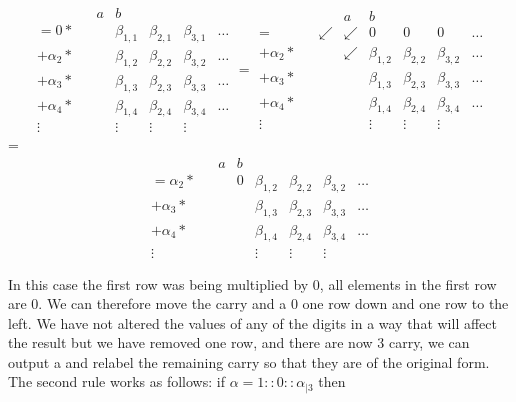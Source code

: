 \documentclass{cs4rep}
\begin{document}
\[ \begin{array}{lcc|ccccc}
& & a & b \\
= 0 * & & & \beta_{1,1} & \beta_{2,1} & \beta_{3,1} & \ldots \\
+ \alpha_{2} * & & & \beta_{1,2} & \beta_{2,2} & \beta_{3,2} & \ldots \\
+ \alpha_{3} * & & & \beta_{1,3} & \beta_{2,3} & \beta_{3,3} & \ldots \\
+ \alpha_{4} * & & & \beta_{1,4} & \beta_{2,4} & \beta_{3,4} & \ldots \\
\vdots & & & \vdots & \vdots & \vdots
\end{array}
=
\begin{array}{lccc|cccc}
& & & a & b \\
= & & \swarrow & \swarrow & 0 & 0 & 0 & \ldots \\
+ \alpha_{2} * & & & \swarrow & \beta_{1,2} & \beta_{2,2} & \beta_{3,2} & \ldots \\
+ \alpha_{3} * & & & & \beta_{1,3} & \beta_{2,3} & \beta_{3,3} & \ldots \\
+ \alpha_{4} * & & & & \beta_{1,4} & \beta_{2,4} & \beta_{3,4} & \ldots \\
\vdots & & & & \vdots & \vdots & \vdots
\end{array} 
\]
=
\[ \begin{array}{lccc|cccc}
& & a & b \\
= \alpha_{2} * & & & 0 & \beta_{1,2} & \beta_{2,2} & \beta_{3,2} & \ldots \\
+ \alpha_{3} * & & & & \beta_{1,3} & \beta_{2,3} & \beta_{3,3} & \ldots \\
+ \alpha_{4} * & & & & \beta_{1,4} & \beta_{2,4} & \beta_{3,4} & \ldots \\
\vdots & & & & \vdots & \vdots & \vdots
\end{array} \]

In this case the first row was being multiplied by 0, all elements in
the first row are 0. We can therefore move the carry and a 0 one row
down and one row to the left. We have not altered the values of any of
the digits in a way that will affect the result but we have removed
one row, and there are now 3 carry, we can output a and relabel the
remaining carry so that they are of the original form. The second rule
works as follows: if $ \alpha = 1 :: 0 :: \alpha_{|3} $ then
\end{document}
